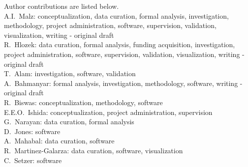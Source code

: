 Author contributions are listed below. \\
A.I.~Malz: conceptualization, data curation, formal analysis, investigation, methodology, project administration, software, supervision, validation, visualization, writing - original draft \\
R.~Hlozek: data curation, formal analysis, funding acquisition, investigation, project administration, software, supervision, validation, visualization, writing - original draft \\
T.~Alam: investigation, software, validation \\
A.~Bahmanyar: formal analysis, investigation, methodology, software, writing - original draft \\
R.~Biswas: conceptualization, methodology, software \\
E.E.O.~Ishida: conceptualization, project administration, supervision \\
G.~Narayan: data curation, formal analysis \\
D.~Jones: software \\
A.~Mahabal: data curation, software \\
R.~Martinez-Galarza: data curation, software, visualization \\
C.~Setzer: software \\
